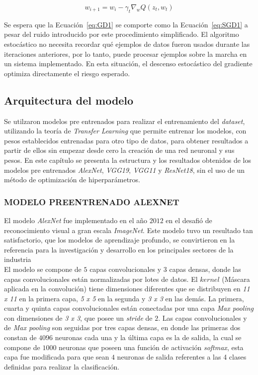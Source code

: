 \begin{equation}
	\label{eq:SGD1}
	{w_{i+1}=w_i-\gamma_t\nabla_w Q(z_t,w_t)}
\end{equation}

Se espera que la Ecuación~\ref{eq:GD1} se comporte como la Ecuación~\ref{eq:SGD1} a pesar del ruido introducido por este procedimiento simplificado. El algoritmo estocástico no necesita recordar qué ejemplos de datos fueron usados durante las iteraciones anteriores, por lo tanto, puede procesar ejemplos sobre la marcha en un sistema implementado. En esta situación, el descenso estocástico del gradiente optimiza directamente el riesgo esperado.	

\subsection{Arquitectura del modelo}

Se utilzaron modelos pre entrenados para realizar el entrenamiento del  \textit{dataset}, utilizando la teoría de \textit{Transfer Learning} que permite entrenar los modelos, con pesos establecidos entrenadas para otro tipo de datos, para obtener resultados a partir de ellos sin empezar desde cero la creación de una red neuronal y sus pesos. En este capítulo se presenta la estructura y los resultados obtenidos de los modelos pre entrenados \textit{AlexNet}, \textit{VGG19}, \textit{VGG11} y \textit{ResNet18}, sin el uso de un método de optimización de hiperparámetros.

\subsubsection{\MakeUppercase{Modelo preentrenado ALEXNET}}

El modelo \textit{AlexNet} fue implementado en el año $2012$ en el desafió de reconocimiento visual a gran escala \textit{ImageNet}. Este modelo tuvo un resultado tan satisfactorio, que los modelos de aprendizaje profundo, se convirtieron en la referencia para la investigación y desarrollo en los principales sectores de la industria \cite{krizhevsky2014one}\\


El modelo se compone de $5$ capas convolucionales y $3$ capas densas, donde las capas convolucionales están normalizadas por lotes de datos. El $kernel$ (Máscara aplicada en la convolución) tiene dimensiones diferentes que se distribuyen en \textit{11 x 11} en la primera capa, \textit{5 x 5} en la segunda y \textit{3 x 3} en las demás. La primera, cuarta y quinta capas convolucionales están conectadas por una capa \textit{Max pooling} con dimensiones de \textit{3 x 3}, que posee un \textit{stride} de $2$. Las capas convolucionales y de \textit{Max pooling} son seguidas por tres capas densas, en donde las primeras dos constan de $4096$ neuronas cada una y la última capa es la de salida, la cual se compone de $1000$ neuronas que poseen una función de activación \textit{softmax}, esta capa fue modificada para que sean $4$ neuronas de salida referentes a las 4 clases definidas para realizar la clasificación.

